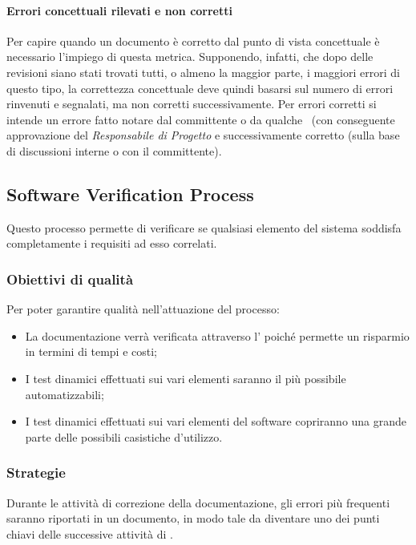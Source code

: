 \documentclass[../PianoDiQualifica.tex]{subfiles}
\begin{document}
			\paragraph{Errori concettuali rilevati e non corretti}
			Per capire quando un documento è corretto dal punto di vista concettuale è necessario l'impiego di questa metrica. Supponendo, infatti, che dopo delle revisioni siano stati trovati tutti, o almeno la maggior parte, i maggiori errori di questo tipo, la correttezza concettuale deve quindi basarsi sul numero di errori rinvenuti e segnalati, ma non corretti successivamente. Per errori corretti si intende un errore fatto notare dal committente o da qualche \verificatore\ (con conseguente approvazione del \textit{Responsabile di Progetto} e successivamente corretto (sulla base di discussioni interne o con il committente).\\

			
		\subsection{Software Verification Process}
		Questo processo permette di verificare se qualsiasi elemento del sistema soddisfa completamente i requisiti ad esso correlati.
			
			\subsubsection{Obiettivi di qualità}
			Per poter garantire qualità nell'attuazione del processo:
			\begin{itemize}
				\item La documentazione verrà verificata attraverso l' poiché permette un risparmio in termini di tempi e costi;
				\item I test dinamici effettuati sui vari elementi saranno il più possibile automatizzabili;
				\item I test dinamici effettuati sui vari elementi del software copriranno una grande parte delle possibili casistiche d'utilizzo.
			\end{itemize}
			
			\subsubsection{Strategie}
			Durante le attività di correzione della documentazione, gli errori più frequenti saranno riportati in un documento, in modo tale da diventare uno dei punti chiavi delle successive attività di .
			
\end{document}
